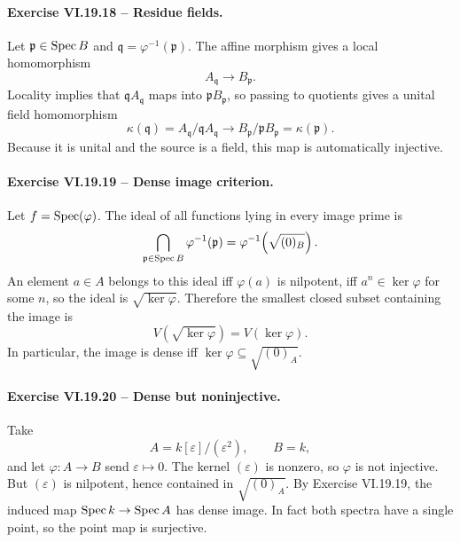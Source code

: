 \paragraph{Exercise VI.19.18 -- Residue fields.}
\begin{solution}
Let \(\mathfrak p\in\operatorname{Spec} B\) and \(\mathfrak q=\varphi^{-1}(\mathfrak p)\).  The affine morphism gives a local homomorphism
\[
A_{\mathfrak q}\longrightarrow B_{\mathfrak p}.
\]
Locality implies that \(\mathfrak qA_{\mathfrak q}\) maps into \(\mathfrak pB_{\mathfrak p}\), so passing to quotients gives a unital field homomorphism
\[
\kappa(\mathfrak q)
=A_{\mathfrak q}/\mathfrak qA_{\mathfrak q}
\longrightarrow
B_{\mathfrak p}/\mathfrak pB_{\mathfrak p}
=\kappa(\mathfrak p).
\]
Because it is unital and the source is a field, this map is automatically injective.
\end{solution}

\paragraph{Exercise VI.19.19 -- Dense image criterion.}
\begin{solution}
Let \(f=\operatorname{Spec}(\varphi)\).  The ideal of all functions lying in every image prime is
\[
\bigcap_{\mathfrak p\in\operatorname{Spec} B}\varphi^{-1}(\mathfrak p)
=\varphi^{-1}\!\left(\sqrt{(0)_B}\right).
\]
An element \(a\in A\) belongs to this ideal iff \(\varphi(a)\) is nilpotent, iff \(a^n\in\ker\varphi\) for some \(n\), so the ideal is \(\sqrt{\ker\varphi}\).  Therefore the smallest closed subset containing the image is
\[
V(\sqrt{\ker\varphi})=V(\ker\varphi).
\]
In particular, the image is dense iff \(\ker\varphi\subseteq\sqrt{(0)_A}\).
\end{solution}

\paragraph{Exercise VI.19.20 -- Dense but noninjective.}
\begin{solution}
Take
\[
A=k[\varepsilon]/(\varepsilon^2),\qquad B=k,
\]
and let \(\varphi:A\to B\) send \(\varepsilon\mapsto0\).  The kernel \((\varepsilon)\) is nonzero, so \(\varphi\) is not injective.  But \((\varepsilon)\) is nilpotent, hence contained in \(\sqrt{(0)_A}\).  By Exercise VI.19.19, the induced map \(\operatorname{Spec} k\to\operatorname{Spec} A\) has dense image.  In fact both spectra have a single point, so the point map is surjective.
\end{solution}


